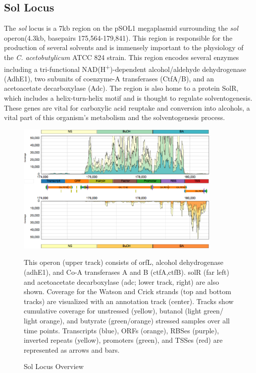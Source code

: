 \subsection{Sol Locus}

The \textit{sol} locus is a 7kb region on the pSOL1 megaplasmid surrounding the \textit{sol} operon(4.3kb, basepairs 175,564-179,841). This region is responsible for the production of several solvents\cite{62,63} and is immensely important to the physiology of the \textit{C. acetobutylicum} ATCC 824 strain. This region encodes several enzymes including a tri-functional NAD(H\textsuperscript{+})-dependent alcohol/aldehyde dehydrogenase (AdhE1)\cite{62}, two subunits of coenzyme-A transferases (CtfA/B)\cite{66}, and an acetoacetate decarboxylase (Adc)\cite{64,65,66}. The region is also home to a protein SolR, which includes a helix-turn-helix motif and is thought to regulate solventogenesis\cite{67}. These genes are vital for carboxylic acid reuptake and conversion into alcohols, a vital part of this organism's metabolism and the solventogenesis process.

\begin{figure}
\small
{\includegraphics[width=\textwidth,height=2.5in]{images/Assembly/Examples/Sol/Sol-locus-curated.png}
\label{fig:5.9}}
\caption{Sol Locus Overview} This operon (upper track) consists of orfL, alcohol dehydrogenase (adhE1), and Co-A transferases A and B (ctfA,ctfB). solR (far left) and acetoacetate decarboxylase (adc; lower track, right) are also shown. Coverage for the Watson and Crick strands (top and bottom tracks) are visualized with an annotation track (center). Tracks show cumulative coverage for unstressed (yellow), butanol (light green/ light orange), and butyrate (green/orange) stressed samples over all time points. Transcripts (blue), ORFs (orange), RBSes (purple), inverted repeats (yellow), promoters (green), and TSSes (red) are represented as arrows and bars.
\end{figure}

